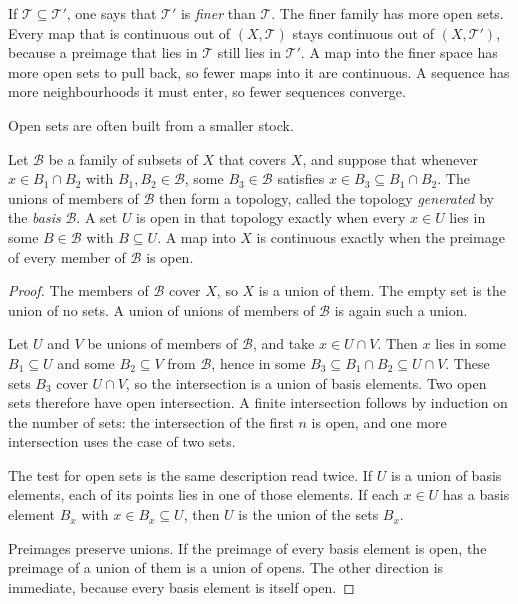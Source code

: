 If $\mathcal T\subseteq\mathcal T'$, one says that $\mathcal T'$ is \emph{finer} than $\mathcal T$. The finer family has more open sets. Every map that is continuous out of $(X,\mathcal T)$ stays continuous out of $(X,\mathcal T')$, because a preimage that lies in $\mathcal T$ still lies in $\mathcal T'$. A map into the finer space has more open sets to pull back, so fewer maps into it are continuous. A sequence has more neighbourhoods it must enter, so fewer sequences converge.

Open sets are often built from a smaller stock.

\begin{proposition}\label{prop:basis}
Let $\mathcal B$ be a family of subsets of $X$ that covers $X$, and suppose that whenever $x\in B_1\cap B_2$ with $B_1,B_2\in\mathcal B$, some $B_3\in\mathcal B$ satisfies $x\in B_3\subseteq B_1\cap B_2$. The unions of members of $\mathcal B$ then form a topology, called the topology \emph{generated} by the \emph{basis} $\mathcal B$. A set $U$ is open in that topology exactly when every $x\in U$ lies in some $B\in\mathcal B$ with $B\subseteq U$. A map into $X$ is continuous exactly when the preimage of every member of $\mathcal B$ is open.
\end{proposition}
\begin{proof}
The members of $\mathcal B$ cover $X$, so $X$ is a union of them. The empty set is the union of no sets. A union of unions of members of $\mathcal B$ is again such a union.

Let $U$ and $V$ be unions of members of $\mathcal B$, and take $x\in U\cap V$. Then $x$ lies in some $B_1\subseteq U$ and some $B_2\subseteq V$ from $\mathcal B$, hence in some $B_3\subseteq B_1\cap B_2\subseteq U\cap V$. These sets $B_3$ cover $U\cap V$, so the intersection is a union of basis elements. Two open sets therefore have open intersection. A finite intersection follows by induction on the number of sets: the intersection of the first $n$ is open, and one more intersection uses the case of two sets.

The test for open sets is the same description read twice. If $U$ is a union of basis elements, each of its points lies in one of those elements. If each $x\in U$ has a basis element $B_x$ with $x\in B_x\subseteq U$, then $U$ is the union of the sets $B_x$.

Preimages preserve unions. If the preimage of every basis element is open, the preimage of a union of them is a union of opens. The other direction is immediate, because every basis element is itself open.
\end{proof}

